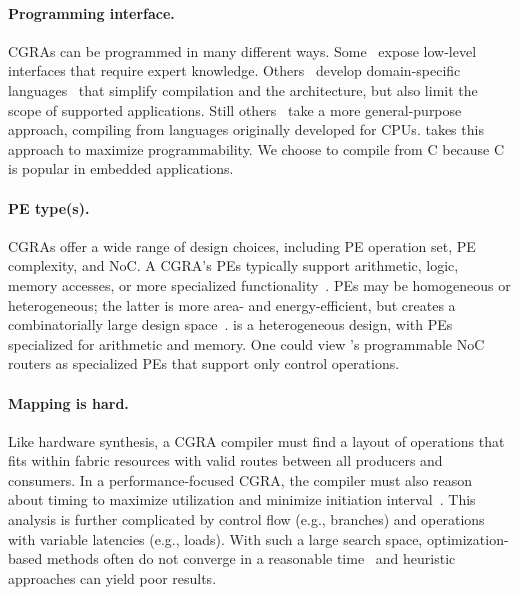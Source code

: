 \paragraph{Programming interface.}
CGRAs can be programmed in many different ways.
% 
Some~\cite{snafu,dally:ieee08:elm} expose low-level interfaces that require expert knowledge.
% 
Others~\cite{plasticine} develop domain-specific languages~\cite{sujeeth2014delite} that simplify compilation and the architecture, but also limit the scope of supported applications.
% 
Still others~\cite{swanson2003wavescalar} take a more general-purpose approach,
compiling from languages originally developed for CPUs.
% 
\riptide takes this approach to maximize programmability.
We choose to compile from C because C is popular in embedded applications.

\paragraph{PE type(s).}
CGRAs offer a wide range of design choices, including PE
operation set, PE complexity, and NoC.
%
A CGRA's PEs typically support arithmetic, logic, memory accesses,
%
or more specialized functionality~\cite{snafu,weng2020dsagen,dadu2019towards,q100,gorgon,capstan,polygraph,taskstream}.
%
PEs may be homogeneous or heterogeneous; the latter is more area- and
energy-efficient, but creates a combinatorially large design space~\cite{revamp}.
%
\riptide is a heterogeneous design, with PEs specialized for
arithmetic and memory.
%
One could view \riptide's programmable NoC routers
as specialized PEs that support only control operations.

\paragraph{Mapping is hard.}
Like hardware synthesis, a CGRA compiler must find a layout of
operations that fits within fabric resources with valid routes between
all producers and consumers.
%
In a performance-focused CGRA, the compiler must also reason
about timing to maximize utilization and minimize
initiation interval~\cite{pathseeker,chordmap,lee2021ultra,himap,4dcgra,amp2020,ureca,balasubramanian2018laser,pager2015software,hamzeh2012epimap,karunaratne2018dnestmap}.
% 
This analysis is further complicated by control flow (e.g., branches) and operations with variable latencies (e.g., loads).
%
With such a large search space, optimization-based methods often
do not converge in a reasonable time~\cite{hybrid-sched,nowatzki2013general} and heuristic approaches can yield poor results.
% 

